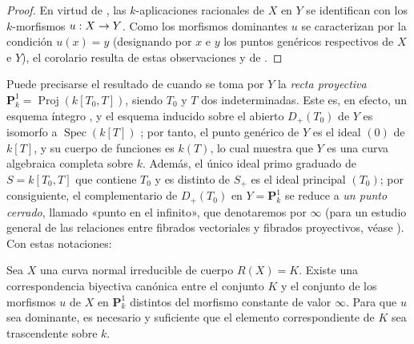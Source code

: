 \documentclass[oneside,10pt]{amsart}
\makeatletter
\newcommand{\ega@arrow}[2]{\mathchoice{#1}{#2}{#2}{#2}}
\renewcommand{\to}{\ega@arrow{\longrightarrow}{\rightarrow}}
\let\EGAOriginalLabel\label
\renewcommand{\label}[1]{\phantomsection\EGAOriginalLabel{#1}}
\makeatother
\begin{document}
\begin{proof}
En virtud de , las $k$-aplicaciones racionales de $X$ en $Y$ se identifican con los $k$-morfismos $u:X\to Y$.
Como los morfismos dominantes $u$ se caracterizan por la condición $u(x)=y$ (designando por $x$ e $y$ los puntos genéricos respectivos de $X$ e $Y$), el corolario resulta de estas observaciones y de .
\end{proof}

\begin{env}[7.4.14]
\label{II.7.4.14-fr}
Puede precisarse el resultado de  cuando se toma por $Y$ la \emph{recta proyectiva} $\mathbf{P}_k^1=\operatorname{Proj}(k[T_0,T])$, siendo $T_0$ y $T$ dos indeterminadas.
Este es, en efecto, un esquema íntegro , y el esquema inducido sobre el abierto $D_+(T_0)$ de $Y$ es isomorfo a $\operatorname{Spec}(k[T])$ ; por tanto, el punto genérico de $Y$ es el ideal $(0)$ de $k[T]$, y su cuerpo de funciones es $k(T)$, lo cual muestra que $Y$ es una curva algebraica completa sobre $k$.
Además, el único ideal primo graduado de $S=k[T_0,T]$ que contiene $T_0$ y es distinto de $S_+$ es el ideal principal $(T_0)$; por consiguiente, el complementario de $D_+(T_0)$ en $Y=\mathbf{P}_k^1$ se reduce a \emph{un punto cerrado}, llamado «punto en el infinito», que denotaremos por $\infty$ (para un estudio general de las relaciones entre fibrados vectoriales y fibrados proyectivos, véase ).
Con estas notaciones:
\end{env}

\begin{corollary}[7.4.15]
\label{II.7.4.15-fr}
Sea $X$ una curva \textup{normal} irreducible de cuerpo $R(X)=K$.
Existe una correspondencia biyectiva canónica entre el conjunto $K$ y el conjunto de los morfismos $u$ de $X$ en $\mathbf{P}_k^1$ distintos del morfismo constante de valor $\infty$.
Para que $u$ sea dominante, es necesario y suficiente que el elemento correspondiente de $K$ sea trascendente sobre $k$.
\end{corollary}
\end{document}
